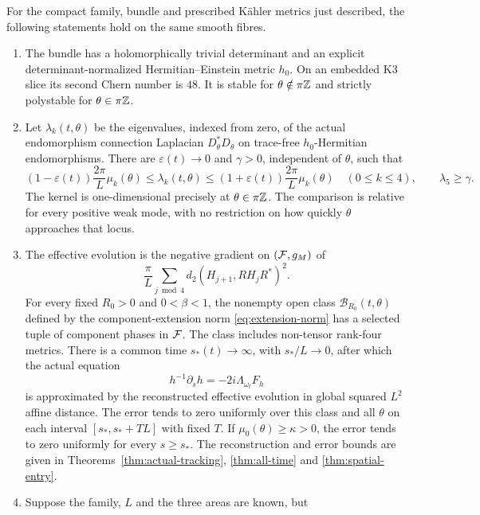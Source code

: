 \begin{theorem}\label{thm:main}
For the compact family, bundle and prescribed K\"ahler metrics just
described, the following statements hold on the same smooth fibres.
\begin{enumerate}
\item The bundle has a holomorphically trivial determinant and an
explicit determinant-normalized Hermitian--Einstein metric $h_0$.
On an embedded K3 slice its second Chern number is $48$. It is
stable for $\theta\notin\pi\mathbb Z$ and strictly polystable for
$\theta\in\pi\mathbb Z$.
\item Let $\lambda_k(t,\theta)$ be the eigenvalues, indexed from
zero, of the actual endomorphism connection Laplacian
$D_\theta^*D_\theta$ on trace-free $h_0$-Hermitian endomorphisms.
There are $\varepsilon(t)\to0$ and $\gamma>0$, independent of
$\theta$, such that
\begin{equation}\label{eq:main-spectrum}
 (1-\varepsilon(t))\frac{2\pi}{L}\mu_k(\theta)
 \le\lambda_k(t,\theta)\le
 (1+\varepsilon(t))\frac{2\pi}{L}\mu_k(\theta)
 \quad(0\le k\le4),\qquad \lambda_5\ge\gamma.
\end{equation}
The kernel is one-dimensional precisely at $\theta\in\pi\mathbb Z$.
The comparison is relative for every positive weak mode, with no
restriction on how quickly $\theta$ approaches that locus.
\item The effective evolution is the negative gradient on $(\mathcal F,g_M)$
of
\begin{equation}\label{eq:main-potential}
 \frac\pi L\sum_{j\bmod4}d_2(H_{j+1},RH_jR^*)^2.
\end{equation}
For every fixed $R_0>0$ and $0<\beta<1$, the nonempty open class
$\mathcal B_{R_0}(t,\theta)$ defined by the component-extension
norm \eqref{eq:extension-norm} has a selected tuple of component
phases in $\mathcal F$. The class includes non-tensor rank-four metrics.
There is a common time $s_*(t)\to\infty$, with $s_*/L\to0$,
after which the actual equation
\[
 h^{-1}\partial_sh=-2i\Lambda_{\omega_t}F_h
\]
is approximated by the reconstructed effective evolution in global
squared $L^2$ affine distance. The error tends to zero uniformly
over this class and all $\theta$ on each interval
$[s_*,s_*+TL]$ with fixed $T$. If $\mu_0(\theta)\ge\kappa>0$,
the error tends to zero uniformly for every $s\ge s_*$.
The reconstruction and error bounds are given in
Theorems~\ref{thm:actual-tracking}, \ref{thm:all-time}
and \ref{thm:spatial-entry}.
\item Suppose the family, $L$ and the three areas are known, but

\end{enumerate}
\end{theorem}
